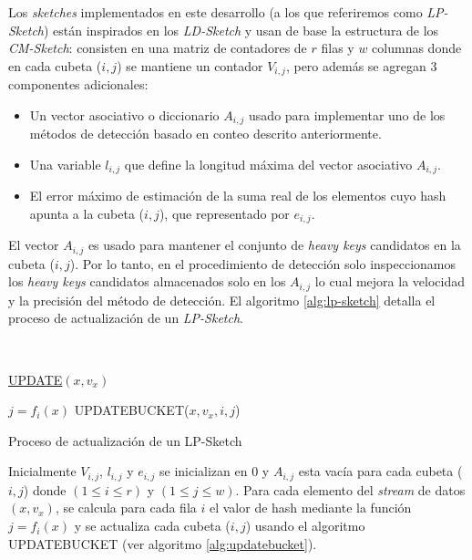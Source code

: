 \documentclass[a4paper,12pt, oneside]{article}
\begin{document}
Los \textit{sketches} implementados en este desarrollo (a los que referiremos como \textit{LP-Sketch}) están inspirados en los \textit{LD-Sketch} y usan de base la estructura de los \textit{CM-Sketch}: consisten en una matriz de contadores de $r$ filas y $w$ columnas donde en cada cubeta ($i,j$) se mantiene un contador $V_{i, j}$, pero además se agregan 3 componentes adicionales:
\begin{itemize}
	\item Un vector asociativo o diccionario $A_{i,j}$ usado para implementar uno de los métodos de detección basado en conteo descrito anteriormente.
	\item Una variable $l_{i,j}$ que define la longitud máxima del vector asociativo $A_{i,j}$.
	\item El error máximo de estimación de la suma real de los elementos cuyo hash apunta a la cubeta ($i,j$), que representado por $e_{i,j}$.
\end{itemize}

El vector $A_{i,j}$ es usado para mantener el conjunto de \textit{heavy keys} candidatos en la cubeta ($i,j$). Por lo tanto, en el procedimiento de detección solo inspeccionamos los \textit{heavy keys} candidatos almacenados solo en los $A_{i,j}$ lo cual mejora la velocidad y la precisión del método de detección. El algoritmo \ref{alg:lp-sketch} detalla el proceso de actualización de un \textit{LP-Sketch}.

\

\begin{algorithm}[ht]
	
	\underline{UPDATE}$(x, v_x)$\;
	
	{
		{
			$j = f_i(x)$\;
			UPDATEBUCKET($x, v_x, i, j$)
		}
	}
	
	\caption{Proceso de actualización de un LP-Sketch}
	\label{alg:lp-sketch}
\end{algorithm}

Inicialmente $V_{i,j}$, $l_{i,j}$ y $e_{i,j}$ se inicializan en $0$ y $A_{i,j}$ esta vacía para cada cubeta ($i,j$) donde $(1\leq i \leq r)$ y $(1\leq j \leq w)$. Para cada elemento del \textit{stream} de datos $(x, v_x)$, se calcula para cada fila $i$ el valor de hash mediante la función $j = f_i(x)$ y se actualiza cada cubeta ($i,j$) usando el algoritmo UPDATEBUCKET (ver algoritmo \ref{alg:updatebucket}).
\end{document}
